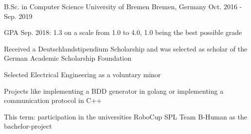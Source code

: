 

\begin{cventries}

  \cventry
    {B.Sc. in Computer Science} %
    {University of Bremen} %
    {Bremen, Germany} %
    {Oct. 2016 - Sep. 2019} %
    {
      \begin{cvitems} %
        \item {GPA Sep. 2018: 1.3 on a scale from 1.0 to 4.0, 1.0 being the best possible grade}
        \item {Received a Deutschlandstipendium Scholarship and was selected as scholar of the German Academic Scholarship Foundation}
        \item {Selected Electrical Engineering as a voluntary minor}
        \item {Projects like implementing a BDD generator in golang or implementing a communication protocol in C++}
        \item {This term: participation in the universities RoboCup SPL Team B-Human as the bachelor-project}        
      \end{cvitems}
    }

\end{cventries}

